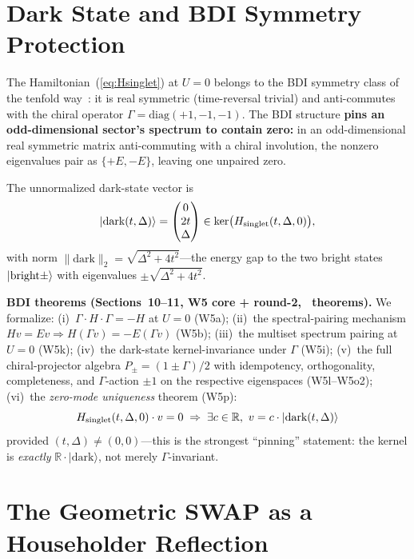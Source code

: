 \documentclass[aps,prd,twocolumn,showpacs,superscriptaddress,nofootinbib]{revtex4-2}
\newcommand{\ket}[1]{|#1\rangle}
\begin{document}
\section{Dark State and BDI Symmetry Protection}
\label{sec:darkstate}

The Hamiltonian~(\ref{eq:Hsinglet}) at $U = 0$ belongs to the BDI
symmetry class of the tenfold way~\cite{Kitaev2009,AltlandZirnbauer}:
it is real symmetric (time-reversal trivial) and anti-commutes with the
chiral operator
$\Gamma = \mathrm{diag}(+1, -1, -1)$. The BDI structure
\textbf{pins an odd-dimensional sector's spectrum to contain zero:}
in an odd-dimensional real symmetric matrix anti-commuting with a chiral
involution, the nonzero eigenvalues pair as $\{+E, -E\}$, leaving one
unpaired zero.

The unnormalized dark-state vector is
\begin{equation}
\ket{\text{dark}(t, \Delta)} = \begin{pmatrix} 0 \\ 2t \\ \Delta \end{pmatrix}
\in \mathrm{ker}\bigl(H_{\rm singlet}(t, \Delta, 0)\bigr),
\end{equation}
with norm $\|\text{dark}\|_2 = \sqrt{\Delta^2 + 4t^2}$---the energy gap
to the two bright states $\ket{\rm bright\pm}$ with eigenvalues
$\pm\sqrt{\Delta^2 + 4t^2}$.

\textbf{BDI theorems (Sections~10--11, W5 core + round-2,
\fhdWaveFive{}~theorems).}
We formalize: (i)~$\Gamma\cdot H\cdot\Gamma = -H$ at $U=0$ (W5a);
(ii)~the spectral-pairing mechanism
$H v = E v \Rightarrow H (\Gamma v) = -E (\Gamma v)$ (W5b);
(iii)~the multiset spectrum pairing at $U=0$ (W5k);
(iv)~the dark-state kernel-invariance under $\Gamma$ (W5i);
(v)~the full chiral-projector algebra
$P_\pm = (1\pm\Gamma)/2$ with idempotency, orthogonality, completeness,
and $\Gamma$-action $\pm 1$ on the respective eigenspaces (W5l--W5o2);
(vi)~the \emph{zero-mode uniqueness} theorem (W5p):
\[
H_{\rm singlet}(t, \Delta, 0)\cdot v = 0
\;\Rightarrow\;
\exists c \in \mathbb{R},\ v = c\cdot\ket{\text{dark}(t,\Delta)}
\]
provided $(t, \Delta) \ne (0, 0)$---this is the strongest ``pinning''
statement: the kernel is \emph{exactly} $\mathbb{R}\cdot\ket{\text{dark}}$,
not merely $\Gamma$-invariant.

\section{The Geometric SWAP as a Householder Reflection}
\label{sec:swap}
\end{document}
